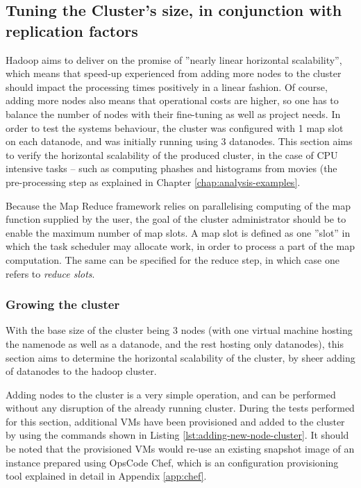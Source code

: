 \subsection{Tuning the Cluster's size, in conjunction with replication factors}
\label{sec:tuning-number-of-nodes}
Hadoop aims to deliver on the promise of ''nearly linear horizontal scalability'', which means that speed-up experienced from adding more nodes to the cluster should impact the processing times positively in a linear fashion. Of course, adding more nodes also means that operational costs are higher, so one has to balance the number of nodes with their fine-tuning as well as project needs. In order to test the systems behaviour, the cluster was configured with 1 map slot on each datanode, and was initially running using 3 datanodes. This section aims to verify the horizontal scalability of the produced cluster, in the case of CPU intensive tasks -- such as computing phashes and histograms from movies (the pre-processing step as explained in Chapter \ref{chap:analysis-examples}.

Because the Map Reduce framework relies on parallelising computing of the map function supplied by the user, the goal of the cluster administrator should be to enable the maximum number of map slots. A map slot is defined as one ''slot'' in which the task scheduler may allocate work, in order to process a part of the map computation. The same can be specified for the reduce step, in which case one refers to \textit{reduce slots}.

\subsubsection{Growing the cluster}
\label{sec:growing-the-cluster}
With the base size of the cluster being 3 nodes (with one virtual machine hosting the namenode as well as a datanode, and the rest hosting only datanodes), this section aims to determine the horizontal scalability of the cluster, by sheer adding of datanodes to the hadoop cluster.

Adding nodes to the cluster is a very simple operation, and can be performed without any disruption of the already running cluster. During the tests performed for this section, additional VMs have been provisioned and added to the cluster by using the commands shown in Listing \ref{lst:adding-new-node-cluster}. It should be noted that the provisioned VMs would re-use an existing snapshot image of an instance prepared using OpsCode Chef, which is an configuration provisioning tool explained in detail in Appendix \ref{app:chef}. 

